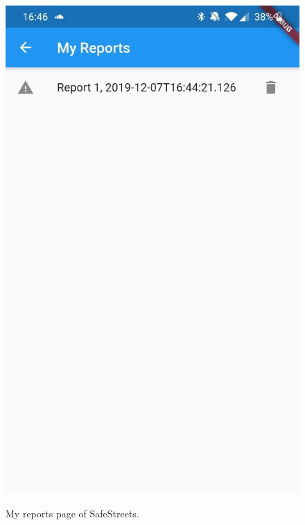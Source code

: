 \documentclass[../RASD.tex]{subfiles}
\begin{document}
    \begin{figure}[H]
        \centering
        \includegraphics[scale = 0.2]{assets/app_screenshots/myrep.jpg}\\
        \caption[\textit{My Reports} Screenshot]{My reports page of SafeStreets.}
    \end{figure}
\end{document}
